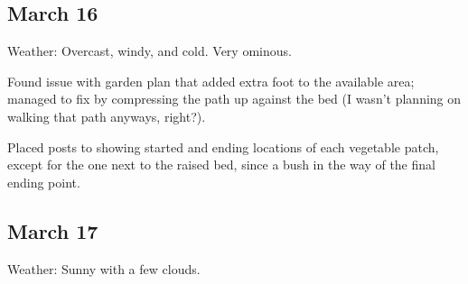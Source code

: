 \documentclass{article}
\begin{document}
\subsection*{March 16}
Weather: Overcast, windy, and cold. Very ominous.

Found issue with garden plan that added extra foot to the available area; managed to fix by compressing the path up against the bed (I wasn't planning on walking that path anyways, right?).

Placed posts to showing started and ending locations of each vegetable patch, except for the one next to the raised bed, since a bush in the way of the final ending point.

\subsection*{March 17}
Weather: Sunny with a few clouds.
\end{document}

